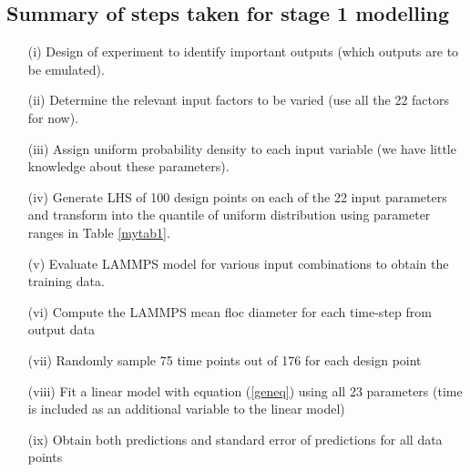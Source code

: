 \documentclass[12pt,titlepage]{report}
\theoremstyle{definition}
\theoremstyle{remark}
\begin{document}
\subsection{Summary of steps taken for stage 1 modelling}
\begin{itemize}
\item[{(i)}] Design of experiment to identify important outputs (which outputs are to be emulated). 
\item[{(ii)}] Determine the relevant input factors to be varied (use all the 22 factors for now). 
\item[{(iii)}] Assign uniform probability density to each input variable (we have little knowledge about these parameters). 
\item[{(iv)}] Generate LHS of 100 design points on each of the 22 input parameters and transform into the quantile of uniform distribution using parameter ranges in Table \ref{mytab1}. 
\item[{(v)}] Evaluate LAMMPS model for various input combinations to obtain the training data.
\item[{(vi)}] Compute the LAMMPS mean floc diameter for each time-step from output data
\item[{(vii)}] Randomly sample 75 time points out of 176 for each design point
\item[{(viii)}] Fit a linear model with equation (\ref{geneq}) using all 23 parameters (time is included as an additional variable to the linear model)
\item[{(ix)}] Obtain both predictions and standard error of predictions for all data points
\end{itemize}
\end{document}
